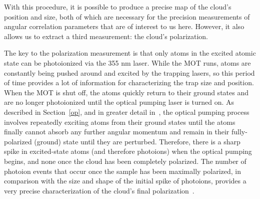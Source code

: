 
With this procedure, it is possible to produce a precise map of the cloud's position and size, both of which are necessary for the precision measurements of angular correlation parameters that are of interest to us here.  However, it also allows us to extract a third measurement:  the cloud's polarization.

The key to the polarization measurement is that only atoms in the excited atomic state can be photoionized via the 355 nm laser.  While the MOT runs, atoms are constantly being pushed around and excited by the trapping lasers, so this period of time provides a lot of information for characterizing the trap size and position.  When the MOT is shut off, the atoms quickly return to their ground states and are no longer photoionized until the optical pumping laser is turned on.  As described in Section~\ref{op}, and in greater detail in~\cite{ben_OP}, the optical pumping process involves repeatedly exciting atoms from their ground states until the atoms finally cannot absorb any further angular momentum and remain in their fully-polarized (ground) state until they are perturbed.  Therefore, there is a sharp spike in excited-state atoms (and therefore photoions) when the optical pumping begins, and none once the cloud has been completely polarized.  The number of photoion events that occur once the sample has been maximally polarized, in comparison with the size and shape of the initial spike of photoions, provides a very precise characterization of the cloud's final polarization~\cite{ben_OP}.



